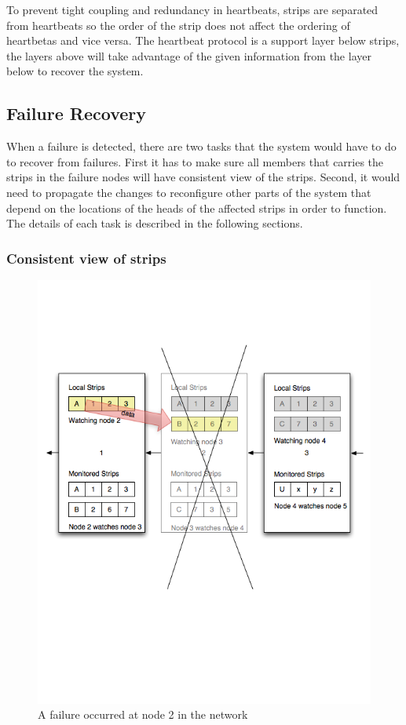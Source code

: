 To prevent tight coupling and redundancy in heartbeats, strips are separated
from heartbeats so the order of the strip does not affect the ordering of
heartbetas and vice versa. The heartbeat protocol is a support layer below
strips, the layers above will take advantage of the given information from the
layer below to recover the system.

\subsection{Failure Recovery}
\label{s:fr}

When a failure is detected, there are two tasks that the system would have to do
to recover from failures. First it has to make sure all members that carries
the strips in the failure nodes will have consistent view of the strips.
Second, it would need to propagate the changes to reconfigure other parts of
the system that depend on the locations of the heads of the affected strips in
order to function. The details of each task is described in the following
sections.

\subsubsection{Consistent view of strips}

\begin{figure}[h!]
\caption{A failure occurred at node 2 in the network}
\label{fig:strip3}
\centering
    \includegraphics[width=\linewidth]{figures/strip3}
\end{figure}

